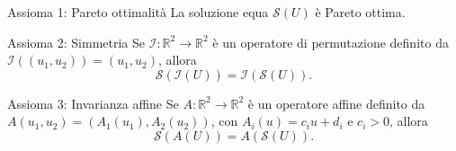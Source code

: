 \documentclass{beamer}
\begin{document}
	\begin{frame}
		\begin{exampleblock}{Assioma 1: Pareto ottimalità} \label{ax1}
			La soluzione equa $\mathcal{S}(U)$ è Pareto ottima.
		\end{exampleblock}
		\begin{exampleblock}{Assioma 2: Simmetria} \label{ax2}
			Se $\mathcal{I}:\mathbb{R}^2 \rightarrow \mathbb{R}^2$ è un operatore di permutazione definito da $\mathcal{I}((u_1,u_2)) = (u_1,u_2)$, allora 
			\begin{equation}
				\mathcal{S}(\mathcal{I}(U)) = \mathcal{I}(\mathcal{S}(U)).
			\end{equation}
		\end{exampleblock}
		\begin{exampleblock}{Assioma 3: Invarianza affine} \label{ax3}
			Se $A: \mathbb{R}^2 \rightarrow \mathbb{R}^2$ è un operatore affine definito da $A(u_1,u_2) = (A_1(u_1),A_2(u_2))$, con $A_i(u) = c_iu + d_i$ e $c_i>0$, allora 
			\begin{equation}
				\mathcal{S}(A(U)) = A(\mathcal{S}(U)).
			\end{equation}
		\end{exampleblock}
	\end{frame}
	
\end{document}
